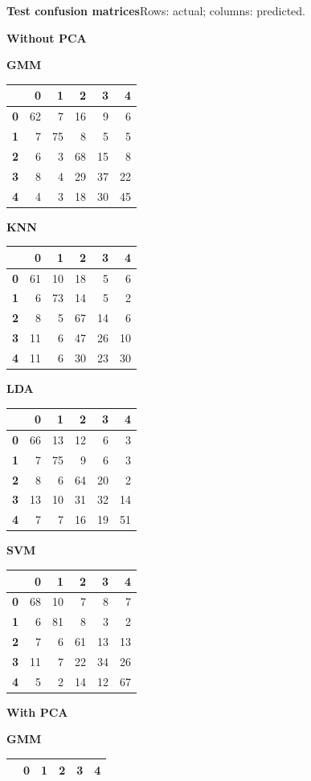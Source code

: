 \documentclass[11pt,a4paper]{article}
\makeatletter
\renewcommand{\arraystretch}{1.12}
\newcommand{\confusion}[3]{%
  \begin{minipage}[t]{0.24\linewidth}
  \setlength{\parskip}{0pt}\centering
  \textbf{#1}\par\vspace{4pt}
  {\normalsize\setlength{\tabcolsep}{2.5pt}%
  \renewcommand{\arraystretch}{1.02}%
  \begin{tabular}{r@{\quad}#2}\toprule
  #3
  \bottomrule\end{tabular}}
  \end{minipage}}
\makeatother
\begin{document}
\noindent\begin{minipage}{\linewidth}
\textbf{Test confusion matrices}\hfill{\footnotesize Rows: actual; columns: predicted.}\par\smallskip
\textbf{Without PCA}\par\smallskip
\confusion{GMM}{rrrrr}{
 & \textbf{0} & \textbf{1} & \textbf{2} & \textbf{3} & \textbf{4} \\ \midrule
\textbf{0} & 62 & 7 & 16 & 9 & 6 \\
\textbf{1} & 7 & 75 & 8 & 5 & 5 \\
\textbf{2} & 6 & 3 & 68 & 15 & 8 \\
\textbf{3} & 8 & 4 & 29 & 37 & 22 \\
\textbf{4} & 4 & 3 & 18 & 30 & 45 \\
}\hfill
\confusion{KNN}{rrrrr}{
 & \textbf{0} & \textbf{1} & \textbf{2} & \textbf{3} & \textbf{4} \\ \midrule
\textbf{0} & 61 & 10 & 18 & 5 & 6 \\
\textbf{1} & 6 & 73 & 14 & 5 & 2 \\
\textbf{2} & 8 & 5 & 67 & 14 & 6 \\
\textbf{3} & 11 & 6 & 47 & 26 & 10 \\
\textbf{4} & 11 & 6 & 30 & 23 & 30 \\
}\hfill
\confusion{LDA}{rrrrr}{
 & \textbf{0} & \textbf{1} & \textbf{2} & \textbf{3} & \textbf{4} \\ \midrule
\textbf{0} & 66 & 13 & 12 & 6 & 3 \\
\textbf{1} & 7 & 75 & 9 & 6 & 3 \\
\textbf{2} & 8 & 6 & 64 & 20 & 2 \\
\textbf{3} & 13 & 10 & 31 & 32 & 14 \\
\textbf{4} & 7 & 7 & 16 & 19 & 51 \\
}\hfill
\confusion{SVM}{rrrrr}{
 & \textbf{0} & \textbf{1} & \textbf{2} & \textbf{3} & \textbf{4} \\ \midrule
\textbf{0} & 68 & 10 & 7 & 8 & 7 \\
\textbf{1} & 6 & 81 & 8 & 3 & 2 \\
\textbf{2} & 7 & 6 & 61 & 13 & 13 \\
\textbf{3} & 11 & 7 & 22 & 34 & 26 \\
\textbf{4} & 5 & 2 & 14 & 12 & 67 \\
}
\par\medskip
\textbf{With PCA}\par\smallskip
\confusion{GMM}{rrrrr}{
 & \textbf{0} & \textbf{1} & \textbf{2} & \textbf{3} & \textbf{4} \\ \midrule
}
\end{minipage}
\end{document}
